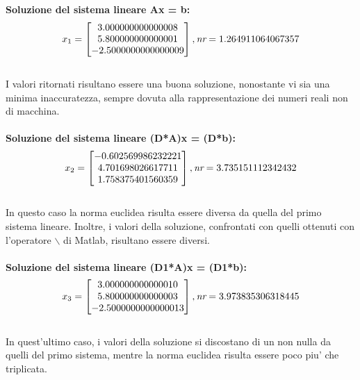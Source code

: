 \documentclass[10pt,a4paper]{article}
\begin{document}
   \textbf{Soluzione del sistema lineare Ax = b:}
  \[
    x_1 =
    \begin{bmatrix}
      3.000000000000008 \\
      5.800000000000001 \\
    -2.5000000000000009 
    \end{bmatrix},
    \\
    \textit{nr} = 1.264911064067357
  \]
  \\
  I valori ritornati risultano essere una buona soluzione, nonostante vi sia 
  una minima inaccuratezza, sempre dovuta alla rappresentazione dei 
  numeri reali non di macchina.
  \\\\
  \textbf{Soluzione del sistema lineare (D*A)x = (D*b):}
  \[
    x_2 =
    \begin{bmatrix}
     -0.602569986232221 \\
      4.701698026617711 \\
      1.758375401560359
    \end{bmatrix},
    \\
    \textit{nr} = 3.735151112342432
  \]
  \\
  In questo caso la norma euclidea risulta essere diversa da quella del primo
  sistema lineare. Inoltre, i valori della soluzione, confrontati
  con quelli ottenuti con l'operatore $ \backslash $ di Matlab, risultano
  essere diversi.
  \\\\
  \textbf{Soluzione del sistema lineare (D1*A)x = (D1*b):}
  \[
    x_3 =
    \begin{bmatrix}
     3.000000000000010 \\
     5.800000000000003 \\
   -2.5000000000000013 
    \end{bmatrix},
    \\
    \textit{nr} = 3.973835306318445
  \]
  \\
  In quest'ultimo caso, i valori della soluzione si discostano di un non nulla
  da quelli del primo sistema, mentre la norma euclidea risulta essere poco
  piu' che triplicata.
\end{document}
